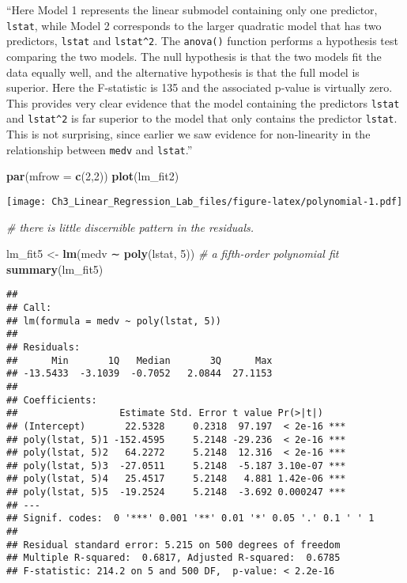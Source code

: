 \documentclass[]{article}
\newenvironment{Shaded}{\begin{snugshade}}{\end{snugshade}}
\newcommand{\CommentTok}[1]{\textcolor[rgb]{0.56,0.35,0.01}{\textit{#1}}}
\newcommand{\DataTypeTok}[1]{\textcolor[rgb]{0.13,0.29,0.53}{#1}}
\newcommand{\DecValTok}[1]{\textcolor[rgb]{0.00,0.00,0.81}{#1}}
\newcommand{\KeywordTok}[1]{\textcolor[rgb]{0.13,0.29,0.53}{\textbf{#1}}}
\newcommand{\NormalTok}[1]{#1}
\newcommand{\StringTok}[1]{\textcolor[rgb]{0.31,0.60,0.02}{#1}}
\begin{document}
``Here Model 1 represents the linear submodel containing only one
predictor, \texttt{lstat}, while Model 2 corresponds to the larger
quadratic model that has two predictors, \texttt{lstat} and
\texttt{lstat\^{}2}. The \texttt{anova()} function performs a hypothesis
test comparing the two models. The null hypothesis is that the two
models fit the data equally well, and the alternative hypothesis is that
the full model is superior. Here the F-statistic is 135 and the
associated p-value is virtually zero. This provides very clear evidence
that the model containing the predictors \texttt{lstat} and
\texttt{lstat\^{}2} is far superior to the model that only contains the
predictor \texttt{lstat}. This is not surprising, since earlier we saw
evidence for non-linearity in the relationship between \texttt{medv} and
\texttt{lstat}.''

\begin{Shaded}
\begin{Highlighting}[]
\KeywordTok{par}\NormalTok{(}\DataTypeTok{mfrow =} \KeywordTok{c}\NormalTok{(}\DecValTok{2}\NormalTok{,}\DecValTok{2}\NormalTok{))}
\KeywordTok{plot}\NormalTok{(lm_fit2)}
\end{Highlighting}
\end{Shaded}

\texttt{[image: Ch3\_Linear\_Regression\_Lab\_files/figure-latex/polynomial-1.pdf]}

\begin{Shaded}
\begin{Highlighting}[]
\CommentTok{# there is little discernible pattern in the residuals.}

\NormalTok{lm_fit5 <-}\StringTok{ }\KeywordTok{lm}\NormalTok{(medv ∼ }\KeywordTok{poly}\NormalTok{(lstat, }\DecValTok{5}\NormalTok{)) }\CommentTok{# a fifth-order polynomial fit}
\KeywordTok{summary}\NormalTok{(lm_fit5)}
\end{Highlighting}
\end{Shaded}

\begin{verbatim}
## 
## Call:
## lm(formula = medv ~ poly(lstat, 5))
## 
## Residuals:
##      Min       1Q   Median       3Q      Max 
## -13.5433  -3.1039  -0.7052   2.0844  27.1153 
## 
## Coefficients:
##                  Estimate Std. Error t value Pr(>|t|)    
## (Intercept)       22.5328     0.2318  97.197  < 2e-16 ***
## poly(lstat, 5)1 -152.4595     5.2148 -29.236  < 2e-16 ***
## poly(lstat, 5)2   64.2272     5.2148  12.316  < 2e-16 ***
## poly(lstat, 5)3  -27.0511     5.2148  -5.187 3.10e-07 ***
## poly(lstat, 5)4   25.4517     5.2148   4.881 1.42e-06 ***
## poly(lstat, 5)5  -19.2524     5.2148  -3.692 0.000247 ***
## ---
## Signif. codes:  0 '***' 0.001 '**' 0.01 '*' 0.05 '.' 0.1 ' ' 1
## 
## Residual standard error: 5.215 on 500 degrees of freedom
## Multiple R-squared:  0.6817, Adjusted R-squared:  0.6785 
## F-statistic: 214.2 on 5 and 500 DF,  p-value: < 2.2e-16
\end{verbatim}
\end{document}
